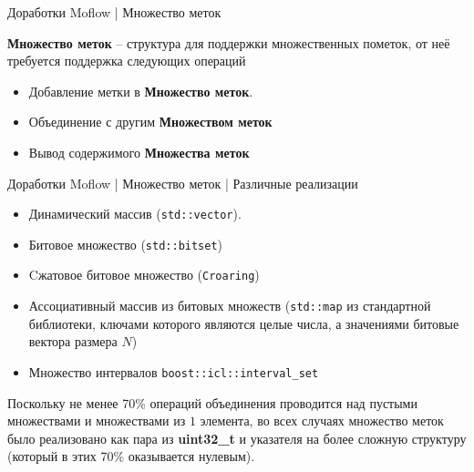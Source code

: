 \documentclass[10pt]{beamer}
\begin{document}
\begin{frame}{Доработки Moflow | Множество меток}
    
    \textbf{Множество меток} -- структура для поддержки множественных пометок, от неё требуется поддержка следующих операций
    \begin{itemize}
        \item Добавление метки в \textbf{Множество меток}.
        \item Объединение с другим \textbf{Множеством меток}
        \item Вывод содержимого \textbf{Множества меток}
     \end{itemize}

\end{frame}

\begin{frame}{Доработки Moflow | Множество меток | Различные реализации }
    \begin{itemize}

        \item Динамический массив (\texttt{std::vector}).
        \item Битовое множество (\texttt{std::bitset})
        \item Cжатовое битовое множество (\texttt{Croaring})
        \item Ассоциативный массив из битовых множеств (\texttt{std::map} из стандартной библиотеки, ключами которого являются целые числа, а значениями битовые вектора размера $N$)
        \item Множество интервалов \texttt{boost::icl::interval\_set}
     \end{itemize}
     \pause
       Поскольку не менее 70\% операций объединения проводится над пустыми множествами и множествами из $1$ элемента, во всех случаях множество меток было реализовано как пара из \textbf{uint32\_t} и указателя на более сложную структуру (который в этих 70\% оказывается нулевым).

\end{frame}
\end{document}
